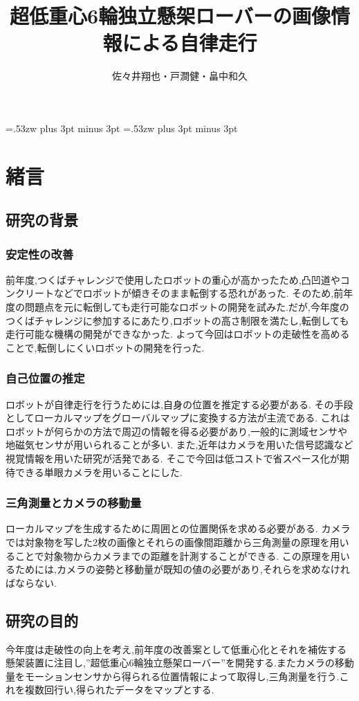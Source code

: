 \documentclass[12pt,oneside]{sotsuken_paper}
\title{超低重心6輪独立懸架ローバーの画像情報による自律走行}
\author{佐々井翔也・戸澗健・畠中和久}
\begin{document}
\setlength{\baselineskip}{9truemm}

\kanjiskip=.53zw plus 3pt minus 3pt
\xkanjiskip=.53zw plus 3pt minus 3pt

\tableofcontents


\chapter{緒言}
\section{研究の背景}

\subsection{安定性の改善}
前年度,つくばチャレンジで使用したロボットの重心が高かったため,凸凹道やコンクリートなどでロボットが傾きそのまま転倒する恐れがあった.
そのため,前年度の問題点を元に転倒しても走行可能なロボットの開発を試みた.だが,今年度のつくばチャレンジに参加するにあたり,ロボットの高さ制限を満たし,転倒しても走行可能な機構の開発ができなかった.
よって今回はロボットの走破性を高めることで,転倒しにくいロボットの開発を行った.
\subsection{自己位置の推定}
ロボットが自律走行を行うためには,自身の位置を推定する必要がある.
その手段としてローカルマップをグローバルマップに変換する方法が主流である.
これはロボットが何らかの方法で周辺の情報を得る必要があり,一般的に測域センサや地磁気センサが用いられることが多い.
また,近年はカメラを用いた信号認識など視覚情報を用いた研究が活発である.
そこで今回は低コストで省スペース化が期待できる単眼カメラを用いることにした.
\subsection{三角測量とカメラの移動量}
ローカルマップを生成するために周囲との位置関係を求める必要がある.
カメラでは対象物を写した2枚の画像とそれらの画像間距離から三角測量の原理を用いることで対象物からカメラまでの距離を計測することができる.
この原理を用いるためには,カメラの姿勢と移動量が既知の値の必要があり,それらを求めなければならない.



\section{研究の目的}
今年度は走破性の向上を考え,前年度の改善案として低重心化とそれを補佐する懸架装置に注目し,”超低重心6輪独立懸架ローバー”を開発する.またカメラの移動量をモーションセンサから得られる位置情報によって取得し,三角測量を行う.これを複数回行い,得られたデータをマップとする.
\end{document}
